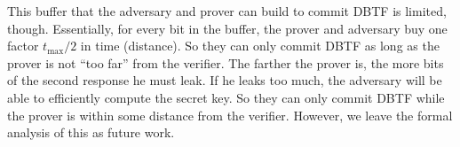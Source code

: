 This buffer that the adversary and prover can build to commit \ac{DBTF} is 
limited, though.
Essentially, for every bit in the buffer, the prover and adversary buy one 
factor \(t_{\max}/2\) in time (\ie distance).
So they can only commit \ac{DBTF} as long as the prover is not \enquote{too 
far} from the verifier.
The farther the prover is, the more bits of the second response he must leak.
If he leaks too much, the adversary will be able to efficiently compute the 
secret key.
So they can only commit \ac{DBTF} while the prover is within some distance from 
the verifier.
However, we leave the formal analysis of this as future work.
